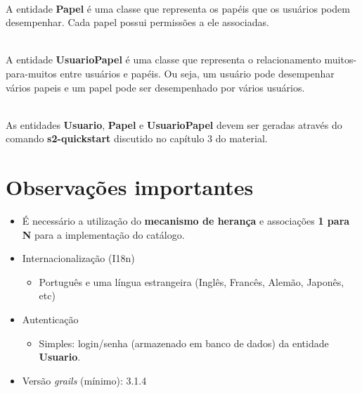 \hspace{1cm}\\
\noindent A  entidade {\bf Papel} é uma  classe que representa os  papéis que os
usuários podem desempenhar.  Cada papel possui  permissões a ele associadas.  

\hspace{1cm}\\
\noindent  A  entidade  {\bf  UsuarioPapel}   é  uma  classe  que  representa  o
relacionamento muitos-para-muitos  entre usuários e papéis. Ou  seja, um usuário
pode  desempenhar vários  papeis e  um papel  pode ser  desempenhado  por vários
usuários.  

\hspace{1cm}\\
\noindent As entidades {\bf Usuario}, {\bf Papel} e {\bf UsuarioPapel} devem ser
geradas  através do  comando  {\bf  s2-quickstart} discutido  no  capítulo 3  do
material.  

\newpage

\section*{Observações importantes}

\vspace{0.3cm}

\begin{itemize}

\item É necessário a utilização do {\bf mecanismo de herança} e associações {\bf
  1 para N} para a implementação do catálogo.

\vspace{0.2cm}

\item Internacionalização (I18n)

\vspace{0.2cm}

\begin{itemize}

\item Português e uma língua estrangeira (Inglês, Francês, Alemão, Japonês, etc)

\end{itemize}

\vspace{0.2cm}

\item Autenticação

\vspace{0.2cm}

\begin{itemize}

\item  Simples: login/senha  (armazenado em  banco  de dados)  da entidade  {\bf
  Usuario}.  

\end{itemize}

\vspace{0.2cm}

\item Versão {\it grails} (mínimo): 3.1.4

\end{itemize}

